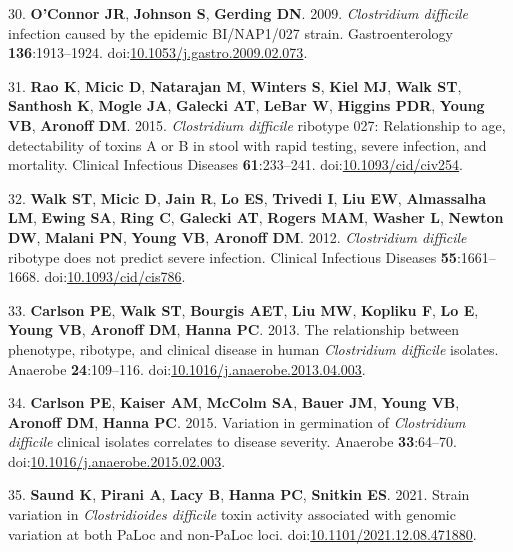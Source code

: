 \documentclass[
  12pt,
]{article}
\newenvironment{cslreferences}%
  {}%
  {\par}
\begin{document}
\begin{cslreferences}
\leavevmode\hypertarget{ref-OConnor2009}{}%
30. \textbf{O'Connor JR}, \textbf{Johnson S}, \textbf{Gerding DN}. 2009.
\emph{Clostridium difficile} infection caused by the epidemic
BI/NAP1/027 strain. Gastroenterology \textbf{136}:1913--1924.
doi:\href{https://doi.org/10.1053/j.gastro.2009.02.073}{10.1053/j.gastro.2009.02.073}.

\leavevmode\hypertarget{ref-Rao2015}{}%
31. \textbf{Rao K}, \textbf{Micic D}, \textbf{Natarajan M},
\textbf{Winters S}, \textbf{Kiel MJ}, \textbf{Walk ST}, \textbf{Santhosh
K}, \textbf{Mogle JA}, \textbf{Galecki AT}, \textbf{LeBar W},
\textbf{Higgins PDR}, \textbf{Young VB}, \textbf{Aronoff DM}. 2015.
\emph{Clostridium difficile} ribotype 027: Relationship to age,
detectability of toxins A or B in stool with rapid testing, severe
infection, and mortality. Clinical Infectious Diseases
\textbf{61}:233--241.
doi:\href{https://doi.org/10.1093/cid/civ254}{10.1093/cid/civ254}.

\leavevmode\hypertarget{ref-Walk2012}{}%
32. \textbf{Walk ST}, \textbf{Micic D}, \textbf{Jain R}, \textbf{Lo ES},
\textbf{Trivedi I}, \textbf{Liu EW}, \textbf{Almassalha LM},
\textbf{Ewing SA}, \textbf{Ring C}, \textbf{Galecki AT}, \textbf{Rogers
MAM}, \textbf{Washer L}, \textbf{Newton DW}, \textbf{Malani PN},
\textbf{Young VB}, \textbf{Aronoff DM}. 2012. \emph{Clostridium
difficile} ribotype does not predict severe infection. Clinical
Infectious Diseases \textbf{55}:1661--1668.
doi:\href{https://doi.org/10.1093/cid/cis786}{10.1093/cid/cis786}.

\leavevmode\hypertarget{ref-Carlson2013}{}%
33. \textbf{Carlson PE}, \textbf{Walk ST}, \textbf{Bourgis AET},
\textbf{Liu MW}, \textbf{Kopliku F}, \textbf{Lo E}, \textbf{Young VB},
\textbf{Aronoff DM}, \textbf{Hanna PC}. 2013. The relationship between
phenotype, ribotype, and clinical disease in human \emph{Clostridium
difficile} isolates. Anaerobe \textbf{24}:109--116.
doi:\href{https://doi.org/10.1016/j.anaerobe.2013.04.003}{10.1016/j.anaerobe.2013.04.003}.

\leavevmode\hypertarget{ref-Carlson2015}{}%
34. \textbf{Carlson PE}, \textbf{Kaiser AM}, \textbf{McColm SA},
\textbf{Bauer JM}, \textbf{Young VB}, \textbf{Aronoff DM}, \textbf{Hanna
PC}. 2015. Variation in germination of \emph{Clostridium difficile}
clinical isolates correlates to disease severity. Anaerobe
\textbf{33}:64--70.
doi:\href{https://doi.org/10.1016/j.anaerobe.2015.02.003}{10.1016/j.anaerobe.2015.02.003}.

\leavevmode\hypertarget{ref-Saund2021}{}%
35. \textbf{Saund K}, \textbf{Pirani A}, \textbf{Lacy B}, \textbf{Hanna
PC}, \textbf{Snitkin ES}. 2021. Strain variation in \emph{Clostridioides
difficile} toxin activity associated with genomic variation at both
PaLoc and non-PaLoc loci.
doi:\href{https://doi.org/10.1101/2021.12.08.471880}{10.1101/2021.12.08.471880}.


\end{cslreferences}
\end{document}
